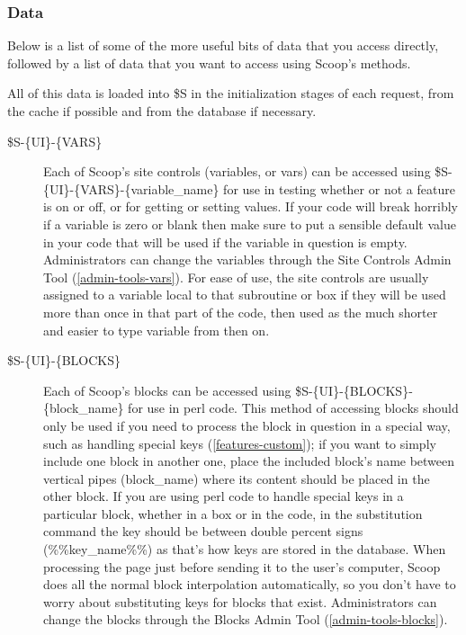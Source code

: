 \subsubsection{Data}

Below is a list of some of the more useful bits of data that you access directly, followed by a list of data that you want to access using Scoop's methods.

All of this data is loaded into \$S in the initialization stages of each request, from the cache if possible and from the database if necessary.

\begin{description}
\item[\$S-\latexhtml{$>$}{>}\{UI\}-\latexhtml{$>$}{>}\{VARS\}] Each of Scoop's site controls (variables, or vars) can be accessed using \$S-\latexhtml{$>$}{>}\{UI\}-\latexhtml{$>$}{>}\{VARS\}-\latexhtml{$>$}{>}\{variable\_name\} for use in testing whether or not a feature is on or off, or for getting or setting values. If your code will break horribly if a variable is zero or blank then make sure to put a sensible default value in your code that will be used if the variable in question is empty. Administrators can change the variables through the Site Controls Admin Tool (\ref{admin-tools-vars}). For ease of use, the site controls are usually assigned to a variable local to that subroutine or box if they will be used more than once in that part of the code, then used as the much shorter and easier to type variable from then on.

\item[\$S-\latexhtml{$>$}{>}\{UI\}-\latexhtml{$>$}{>}\{BLOCKS\}] Each of Scoop's blocks can be accessed using \$S-\latexhtml{$>$}{>}\{UI\}-\latexhtml{$>$}{>}\{BLOCKS\}-\latexhtml{$>$}{>}\{block\_name\} for use in perl code. This method of accessing blocks should only be used if you need to process the block in question in a special way, such as handling special keys (\ref{features-custom}); if you want to simply include one block in another one, place the included block's name between vertical pipes (\latexhtml{$\vert$}{|}block\_name\latexhtml{$\vert$}{|}) where its content should be placed in the other block. If you are using perl code to handle special keys in a particular block, whether in a box or in the code, in the substitution command the key should be between double percent signs (\%\%key\_name\%\%) as that's how keys are stored in the database. When processing the page just before sending it to the user's computer, Scoop does all the normal block interpolation automatically, so you don't have to worry about substituting keys for blocks that exist. Administrators can change the blocks through the Blocks Admin Tool (\ref{admin-tools-blocks}).


\end{description}
